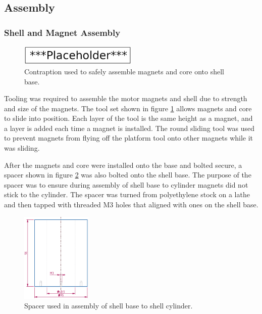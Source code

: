 \documentclass[a4paper,12pt]{article}
\begin{document}
\subsection{Assembly}

\subsubsection{Shell and Magnet Assembly} \label{section:shellassembly}

\begin{figure}[h!]
    \centering
    \includegraphics[width=0.5\textwidth]{placeholder.png}
    \caption{Contraption used to safely assemble magnets and core onto shell base.}
    \label{fg:assemblingmagnet}
\end{figure}

Tooling was required to assemble the motor magnets and shell due to strength and size of the magnets. The tool set shown in figure \ref{fg:assemblingmagnet} allows magnets and core to slide into position. Each layer of the tool is the same height as a magnet, and a layer is added each time a magnet is installed. The round sliding tool was used to prevent magnets from flying off the platform tool onto other magnets while it was sliding.

After the magnets and core were installed onto the base and bolted secure, a spacer shown in figure \ref{fg:spacer} was also bolted onto the shell base. The purpose of the spacer was to ensure during assembly of shell base to cylinder magnets did not stick to the cylinder. The spacer was turned from polyethylene stock on a lathe and then tapped with threaded M3 holes that aligned with ones on the shell base.

\begin{figure}[h!]
    \centering
    \includegraphics[width=0.3\textwidth]{spacer.png}
    \caption{Spacer used in assembly of shell base to shell cylinder.}
    \label{fg:spacer}
\end{figure}
\end{document}
